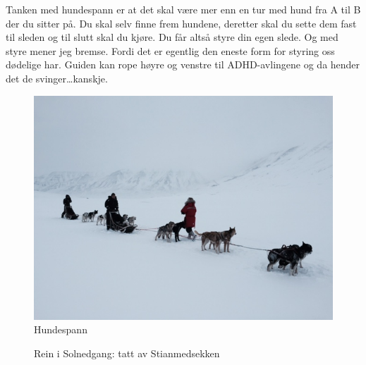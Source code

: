 Tanken med hundespann  er at det skal være mer enn en tur
med hund fra A til B der du sitter på. Du skal selv finne frem hundene, deretter
skal du sette dem fast til sleden og til slutt skal du kjøre. Du får
altså styre din egen slede. Og med styre mener jeg bremse. Fordi det
er egentlig den eneste form for styring oss dødelige har.
Guiden kan rope høyre og venstre til ADHD-avlingene og da hender det
de svinger\ldots kanskje.

\begin{figure}[h!]
	\centering
	\includegraphics[width=\textwidth]{Hundespann}
	\caption*{Hundespann}
\label{fig:hundespann}

\end{figure}
\begin{figure}[H]
	\centering
\noindent{}	
	\caption*{Rein i Solnedgang: tatt av Stianmedsekken}
\label{fig:rein}
\end{figure}
